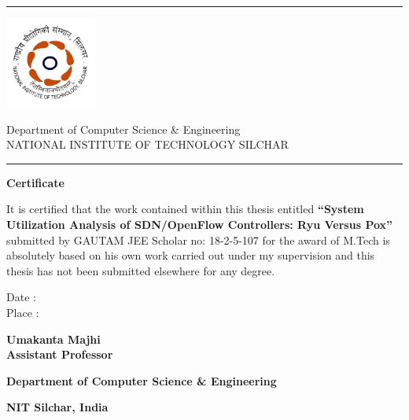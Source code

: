 \vspace*{0.5\fill}
\setlength{\headsep}{0.4in}
\noindent \rule{\linewidth}{1mm}
\begin{minipage}{0.2\textwidth}
\includegraphics[width=3cm,keepaspectratio]{images/NIT_Silchar_logo.png}
\end{minipage}
\begin{minipage}{\textwidth}
\large{Department of Computer Science \& Engineering}\\
\large{\MakeUppercase{NATIONAL INSTITUTE OF TECHNOLOGY SILCHAR}}
\end{minipage}

{\noindent \rule{\linewidth}{1mm}} \vspace{0.25in}



\begin{center}



{\bf \LARGE Certificate}

\end{center}

\par
It is certified that the work contained within this thesis entitled \textbf{``System \linebreak Utilization Analysis of SDN/OpenFlow Controllers: Ryu Versus Pox''} submitted by \linebreak GAUTAM JEE Scholar no: 18-2-5-107 for the award of M.Tech is absolutely based on his own work carried out under my supervision and this thesis has not been submitted elsewhere for any degree.
\vspace{1cm}

\begin{minipage}{0.3\textwidth}
\begin{flushleft}
\vspace{1in}
Date  : \\
\vspace{0.3cm}
Place : 
\end{flushleft}
\end{minipage}
\begin{minipage}{0.65\textwidth}
\begin{flushright}
\vspace{5cm}
\textbf{Umakanta Majhi}\\
\textbf{Assistant Professor}
 
\textbf{Department of Computer Science \& Engineering}

\textbf{NIT Silchar, India }                                        \end{flushright}
\end{minipage}
\pagebreak
